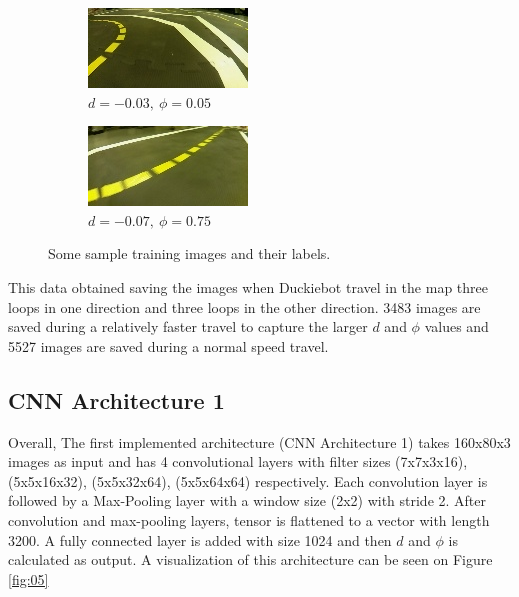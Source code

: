 \documentclass[11pt,letterpaper]{article}
\begin{document}
\begin{figure}[h!]
\begin{subfigure}[b]{0.24\linewidth}
 	\end{subfigure}
 	\begin{subfigure}[b]{0.24\linewidth}
 		\includegraphics[width=\linewidth]{06071.jpg}
 		\caption{$d=-0.03,\ \phi=0.05$}
 	\end{subfigure}
 	\begin{subfigure}[b]{0.24\linewidth}
 		\includegraphics[width=\linewidth]{06370.jpg}
 		\caption{$d=-0.07,\ \phi=0.75$}
 	\end{subfigure}
 	\caption{Some sample training images and their labels.}
 	\label{fig:04}
 \end{figure} 
	
	This data obtained saving the images when Duckiebot travel in the map three loops in one direction and three loops in the other direction. 3483 images are saved during a relatively faster travel to capture the larger $d$ and $\phi$ values and 5527 images are saved during a normal speed travel.
	
	\subsection{CNN Architecture 1}
	Overall, The first implemented architecture (CNN Architecture 1) takes 160x80x3 images as input and has 4 convolutional layers with filter sizes (7x7x3x16), (5x5x16x32), (5x5x32x64), (5x5x64x64) respectively. Each convolution layer is followed by a Max-Pooling layer with a window size (2x2) with stride 2. After convolution and max-pooling layers, tensor is flattened to a vector with length 3200. A fully connected layer is added with size 1024 and then $d$ and $\phi$ is calculated as output. A visualization of this architecture can be seen on Figure \ref{fig:05}
	
\end{document}
